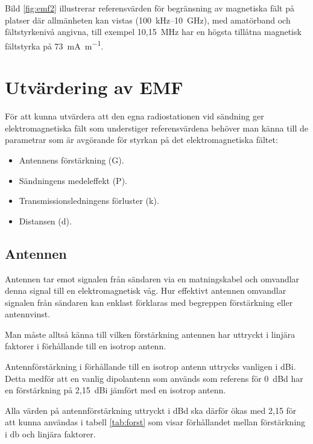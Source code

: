 
Bild \ref{fig:emf2} illustrerar referensvärden för begränsning av magnetiska
fält på platser där allmänheten kan vistas (100~kHz--10~GHz), med amatörband
och fältstyrkenivå angivna, till exempel 10,15~MHz har en högsta tillåtna
magnetisk fältstyrka på \SI{73}{\milli\ampere\per\metre}.

\section{Utvärdering av EMF}

För att kunna utvärdera att den egna radiostationen vid sändning ger
elektromagnetiska fält som understiger referensvärdena behöver man känna till
de parametrar som är avgörande för styrkan på det elektromagnetiska fältet:

\begin{itemize}
  \item Antennens förstärkning (G).
  \item Sändningens medeleffekt (P).
  \item Transmissionsledningens förluster (k).
  \item Distansen (d).
\end{itemize}

\subsection{Antennen}
Antennen tar emot signalen från sändaren via en matningskabel och
omvandlar denna signal till en elektromagnetisk våg.
Hur effektivt antennen omvandlar signalen från sändaren kan enklast förklaras
med begreppen förstärkning eller antennvinst.

Man måste alltså känna till vilken förstärkning antennen har uttryckt i linjära
faktorer i förhållande till en isotrop antenn.

Antennförstärkning i förhållande till en isotrop antenn uttrycks vanligen i dBi.
Detta medför att en vanlig dipolantenn som används som referens för 0~dBd har
en förstärkning på 2,15~dBi jämfört med en isotrop antenn.


Alla värden på antennförstärkning uttryckt i dBd ska därför ökas med 2,15 för
att kunna användas i tabell \ref{tab:forst} som visar förhållandet mellan
förstärkning i \si{\decibel} och linjära faktorer.

